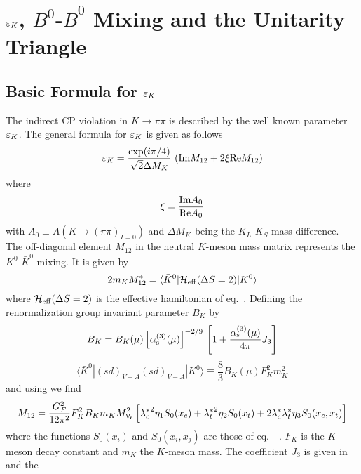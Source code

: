 \section{$\varepsilon_K$, $B^0$-$\bar B^0$ Mixing and the Unitarity Triangle}
        \label{sec:epsBBUT}
\subsection{Basic Formula for $\varepsilon_K$}
            \label{subsec:epsformula}
The indirect CP violation in $K \to \pi\pi$ is described by the well
known parameter $\varepsilon_K$. The general formula for $\varepsilon_K$ is given as
follows
\begin{equation}
\varepsilon_K = \frac{\exp(i \pi/4)}{\sqrt{2} \Delta M_K} \,
\left( {\rm Im} M_{12} + 2 \xi {\rm Re} M_{12} \right)
\label{eq:epsdef}
\end{equation}
where
\begin{equation}
\xi = \frac{{\rm Im} A_0}{{\rm Re} A_0}
\label{eq:xi}
\end{equation}
with $A_0 \equiv A(K \to (\pi\pi)_{I=0})$ and $\Delta M_K$ being
the $K_L$-$K_S$ mass difference. The off-diagonal element $M_{12}$ in
the neutral $K$-meson mass matrix represents the $K^0$-$\bar K^0$
mixing. It is given by
\begin{equation}
2 m_K M^*_{12} = \langle \bar K^0| {\cal H}_{\rm eff}(\Delta S=2) |K^0\rangle
\label{eq:M12Kdef}
\end{equation}
where ${\cal H}_{\rm eff}(\Delta S=2)$ is the effective hamiltonian of eq.\
. Defining the renormalization group invariant parameter
$B_K$ by
\begin{equation}
B_K = B_K(\mu) \left[ \alpha_{\rm s}^{(3)}(\mu) \right]^{-2/9} \,
\left[ 1 + \frac{\alpha_{\rm s}^{(3)}(\mu)}{4\pi} J_3 \right]
\label{eq:BKrenorm}
\end{equation}
\begin{equation}
\langle \bar K^0| (\bar s d)_{V-A} (\bar s d)_{V-A} |K^0\rangle
\equiv \frac{8}{3} B_K(\mu) F_K^2 m_K^2
\label{eq:KbarK}
\end{equation}
and using  we find
\begin{equation}
M_{12} = \frac{G_F^2}{12 \pi^2} F_K^2 B_K m_K M_{\rm W}^2
\left[ {\lambda_c^*}^2 \eta_1 S_0(x_c) + {\lambda_t^*}^2 \eta_2 S_0(x_t) +
2 {\lambda_c^*} {\lambda_t^*} \eta_3 S_0(x_c, x_t) \right]
\label{eq:M12K}
\end{equation}
where the functions $S_0(x_i)$ and $S_0(x_i, x_j)$ are those of eq.\
--. $F_K$ is the $K$-meson decay constant and $m_K$
the $K$-meson mass. The coefficient $J_3$ is given in \eqn{zd0} and the
